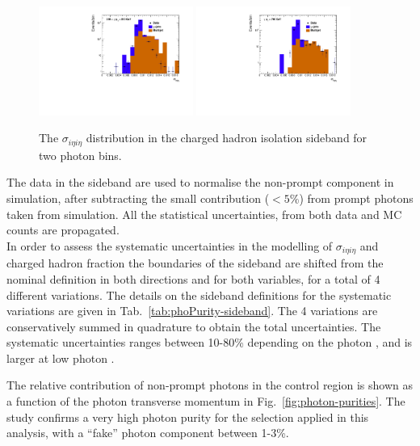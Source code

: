 \begin{figure}[h!]
  \centering
  \includegraphics[width=0.45\textwidth]{figures/photonpurity/sigmaIetaIeta_chHadIsoSB_all_gammaPt_200_250_nominal} 
  \includegraphics[width=0.45\textwidth]{figures/photonpurity/sigmaIetaIeta_chHadIsoSB_all_gammaPt_700_999999_nominal} 
  \caption{\label{fig:chHadIsoSideband} 
  The $\sigma_{i\eta i\eta}$ distribution in the charged hadron isolation sideband for two photon \pt bins. }
\end{figure}



The data in the sideband are used to normalise the non-prompt component in simulation, 
after subtracting the small contribution ($<5$\%) from prompt photons taken from simulation. 
All the statistical uncertainties, from both data and MC counts are propagated. \\
In order to assess the systematic uncertainties in the modelling of $\sigma_{i\eta i\eta}$ 
and charged hadron fraction the boundaries of the sideband are shifted from the 
nominal definition in both directions and for both variables, for a total of 4 different variations. 
The details on the sideband definitions for the systematic variations are given in Tab.~\ref{tab:phoPurity-sideband}. 
The 4 variations are conservatively summed in quadrature to obtain the total uncertainties. 
The systematic uncertainties ranges between 10-80\% depending on the photon \pt, 
and is larger at low photon \pt.

The relative contribution of non-prompt photons in the \gj control region 
is shown as a function of the photon transverse momentum in Fig.~\ref{fig:photon-purities}.
The study confirms a very high photon purity for the selection applied in this analysis, 
with a ``fake'' photon component between 1-3\%. 

